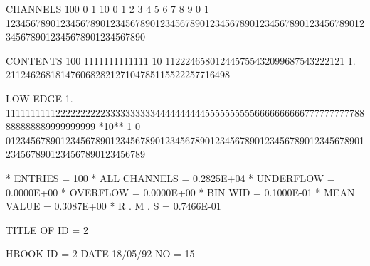 \begin{Listing}
 CHANNELS 100   0                                                                                                  1   
           10   0        1         2         3         4         5         6         7         8         9         0   
            1   1234567890123456789012345678901234567890123456789012345678901234567890123456789012345678901234567890   
 
 CONTENTS 100                          1111111111111                                                                
           10                 112224658012445755432099687543222121                                                  
            1.       211246268181476068282127104785115522257716498                                                  
 
 LOW-EDGE   1.            111111111122222222223333333333444444444455555555556666666666777777777788888888889999999999
 *10**  1   0   0123456789012345678901234567890123456789012345678901234567890123456789012345678901234567890123456789
 
 * ENTRIES =        100      * ALL CHANNELS = 0.2825E+04      * UNDERFLOW = 0.0000E+00      * OVERFLOW = 0.0000E+00
 * BIN WID = 0.1000E-01      * MEAN VALUE   = 0.3087E+00      * R . M . S = 0.7466E-01
 
\newpage

 TITLE OF ID = 2                                                                 
 
 HBOOK     ID =         2                                        DATE  18/05/92              NO =    15
 

\end{Listing}
